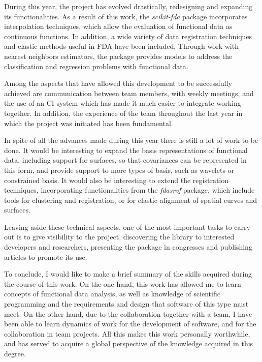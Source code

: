 
During this year, the project has evolved drastically, redesigning and expanding
its functionalities.
As a result of this work, the \textit{scikit-fda} package incorporates
interpolation techniques, which allow the evaluation of functional data as
continuous functions. In addition, a wide variety of data registration
techniques and elastic methods useful in \acs{FDA} have been included.
Through work with nearest neighbors estimators,
the package provides models to address the classification and regression problems
with functional data.

Among the aspects that have allowed this development to be successfully achieved
are communication between team members, with weekly meetings, and the use of
an CI system which has made it much easier to integrate working together.
In addition, the experience of the team throughout the last year in which the
project was initiated has been fundamental.

In spite of all the advances made during this year there is still a lot of work
to be done.
It would be interesting to expand the basis
representations of functional data, including support for surfaces, so that
covariances can be represented in this form, and provide support to more types of basis,
such as wavelets \cite{Morettin2017} or constrained basis\cite{Ramsay2005}.
It would also be interesting to extend the registration techniques,
incorporating functionalities from the \textit{fdasrvf}\cite{fdasrvf} package,
which include tools for clustering and registration, or for elastic
alignment of spatial curves and surfaces.

Leaving aside these technical aspects, one of the most important tasks to carry
out is to give visibility to the project, discovering the library to interested
developers and researchers, presenting the package in congresses and publishing
articles to promote its use.

To conclude, I would like to make a brief summary of the skills acquired during
the course of this work. On the one hand, this work has allowed me to learn concepts
of functional data analysis, as well as knowledge of scientific programming
and the requirements and design that software of this type must meet.
On the other hand, due to the collaboration together with a team,
I have been able to learn dynamics of work for the development of software,
and for the collaboration in team projects.
All this  makes this work personally worthwhile,  and has served to acquire a
global perspective of the knowledge acquired in this degree.
